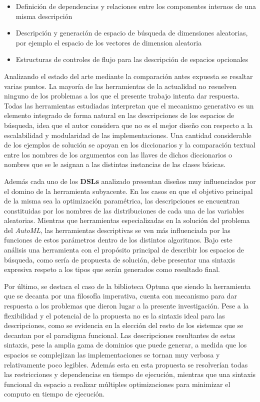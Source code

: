 \begin{itemize}
\begin{itemize}
                  \item Definición de dependencias y relaciones entre los componentes internos de una misma descripción
                  \item Descripción y generación de espacio de búsqueda de dimensiones aleatorias, por ejemplo el espacio
                        de los vectores de dimension aleatoria
                  \item Estructuras de controles de flujo para las descripción de espacios opcionales
            \end{itemize}

\end{itemize}


Analizando el estado del arte mediante la comparación antes expuesta se
resaltar varias puntos. La mayoría de las herramientas de la actualidad
no resuelven ninguno de los problemas a los que el presente trabajo intenta
dar respuesta. Todas las herramientas estudiadas interpretan que el mecanismo
generativo es un elemento integrado de forma natural en las descripciones de
los espacios de búsqueda, idea que el autor considera que no es el mejor
diseño con respecto a la escalabilidad y modularidad de las implementaciones.
Una cantidad considerable de los ejemplos de solución se apoyan en los diccionarios
y la comparación textual entre los nombres de los argumentos con las llaves
de dichos diccionarios o nombres que se le asignan a las distintas instancias de
las clases básicas.

Además cada uno de los {\bf DSLs} analizado presentan diseños muy influenciados
por el domino de la herramienta subyacente. En los casos en que el objetivo
principal de la misma sea la optimización paramétrica, las descripciones se
encuentran constituidas por los nombres de las distribuciones de cada una de
las variables aleatorias. Mientras que herramientas especializadas en la solución
del problema del {\it AutoML}, las herramientas descriptivas se ven más influenciada
por las funciones de estos parámetros dentro de los distintos algoritmos. Bajo este
análisis una herramienta con el propósito principal de describir los espacios de
búsqueda, como sería de propuesta de solución, debe presentar una sintaxis expresiva
respeto a los tipos que serán generados como resultado final.

Por último, se destaca el caso de la biblioteca Optuna que siendo la herramienta
que se decanta por una filosofía imperativa, cuenta con mecanismo para dar respuesta
a los problemas que dieron lugar a la presente investigación. Pese a la flexibilidad
y el potencial de la propuesta no es la sintaxis ideal para las descripciones, como se
evidencia en la elección del resto de los sistemas que se decantan por el paradigma
funcional. Las descripciones resultantes de estas sintaxis, pese la amplia gama de
dominios que puede generar, a medida que los espacios se complejizan las implementaciones
se tornan muy verbosa y relativamente poco legibles. Además esta en esta propuesta se
resolverían todas las restricciones y dependencias en tiempo de ejecución, mientras
que una sintaxis funcional da espacio a realizar múltiples optimizaciones para
minimizar el computo en tiempo de ejecución.

\cite{einstein}
\nocite{fogel2006evolutionary}